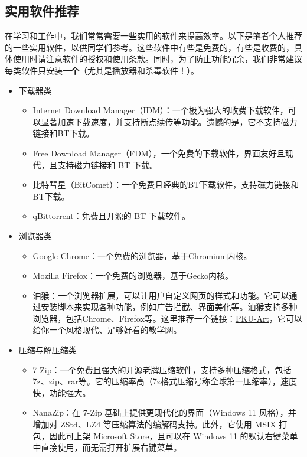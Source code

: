 \subsection{实用软件推荐}

在学习和工作中，我们常常需要一些实用的软件来提高效率。以下是笔者个人推荐的一些实用软件，以供同学们参考。这些软件中有些是免费的，有些是收费的，具体使用时请注意软件的授权和使用条款。同时，为了防止功能冗余，我们非常建议每类软件只安装\textbf{一个}（尤其是播放器和杀毒软件！）。

\begin{itemize}
  \item 下载器类
    \begin{itemize}
      \item Internet Download Manager（IDM）：一个极为强大的收费下载软件，可以显著加速下载速度，并支持断点续传等功能。遗憾的是，它不支持磁力链接和BT下载。
      \item Free Download Manager（FDM），一个免费的下载软件，界面友好且现代，且支持磁力链接和 BT 下载。
      \item 比特彗星（BitComet）：一个免费且经典的BT下载软件，支持磁力链接和BT下载。
      \item qBittorrent：免费且开源的 BT 下载软件。
    \end{itemize}
  \item 浏览器类
    \begin{itemize}
      \item Google Chrome：一个免费的浏览器，基于Chromium内核。
      \item Mozilla Firefox：一个免费的浏览器，基于Gecko内核。
      \item 油猴：一个浏览器扩展，可以让用户自定义网页的样式和功能。它可以通过安装脚本来实现各种功能，例如广告拦截、界面美化等。油猴支持多种浏览器，包括Chrome、Firefox等。这里推荐一个链接：\href{https://github.com/zhuozhiyongde/PKU-Art}{PKU-Art}，它可以给你一个风格现代、足够好看的教学网。
    \end{itemize}
  \item 压缩与解压缩类
    \begin{itemize}
      \item 7-Zip：一个免费且强大的开源老牌压缩软件，支持多种压缩格式，包括7z、zip、rar等。它的压缩率高（7z格式压缩号称全球第一压缩率），速度快，功能强大。
      \item NanaZip：在 7-Zip 基础上提供更现代化的界面（Windows 11 风格），并增加对 ZStd、LZ4 等压缩算法的编解码支持。此外，它使用 MSIX 打包，因此可上架 Microsoft Store，且可以在 Windows 11 的默认右键菜单中直接使用，而无需打开扩展右键菜单。

\end{itemize}
\end{itemize}
